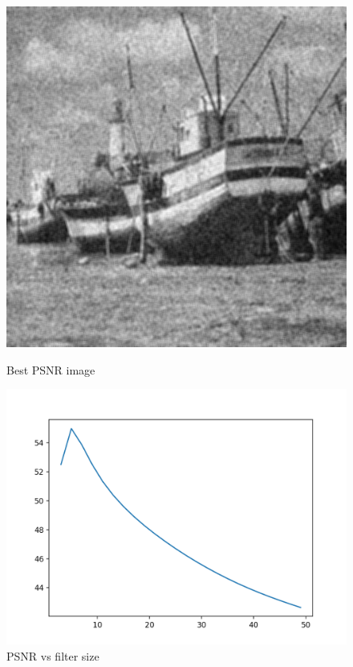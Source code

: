 \documentclass{article}
\begin{document}
    \begin{figure}[!htb]
      \includegraphics[scale=0.3]{./basic_denoising/boat/average_best_gaussian.png}
      \caption{Best PSNR image}
    \endminipage \hfill
      \includegraphics[scale=.45]{./basic_denoising/boat/average_psnr_gaussian.png}
      \caption{PSNR vs filter size}
    \endminipage
    \end{figure}
    
\end{document}

